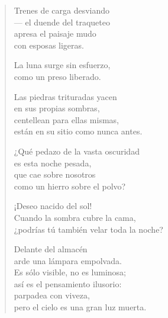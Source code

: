 \documentclass[11pt]{book}
\newcommand*{\centeredornament}{\centerline{\pgfornament[width=6cm]{88}}}
\begin{document}
\vspace*{-15mm}
\centeredornament




\begin{verse}
  Trenes de carga desviando \\
  --- el duende del traqueteo \\
  apresa el paisaje mudo \\
  con esposas ligeras.

  La luna surge sin esfuerzo, \\
  como un preso liberado.

  Las piedras trituradas yacen \\
  en sus propias sombras, \\
  centellean para ellas mismas, \\
  están en su sitio como nunca antes.

  ¿Qué pedazo de la vasta oscuridad \\
  es esta noche pesada, \\
  que cae sobre nosotros \\
  como un hierro sobre el polvo?

  ¡Deseo nacido del sol! \\
  Cuando la sombra cubre la cama, \\
  ¿podrías tú también velar toda la noche?

  Delante del almacén \\
  arde una lámpara empolvada. \\
  Es sólo visible, no es luminosa; \\
  así es el pensamiento ilusorio: \\
  parpadea con viveza, \\
  pero el cielo es una gran luz muerta.
\end{verse}

\newpage

\vspace*{-15mm}
\centeredornament


\end{document}
